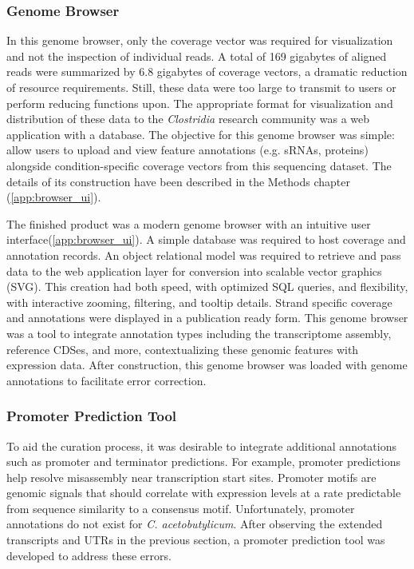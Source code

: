 \subsubsection{Genome Browser}
In this genome browser, only the coverage vector was required for visualization and not the inspection of individual reads. A total of 169 gigabytes of aligned reads were summarized by 6.8 gigabytes of coverage vectors, a dramatic reduction of resource requirements. Still, these data were too large to transmit to users or perform reducing functions upon. The appropriate format for visualization and distribution of these data to the \textit{Clostridia} research community was a web application with a database. The objective for this genome browser was simple: allow users to upload and view feature annotations (e.g. sRNAs, proteins) alongside condition-specific coverage vectors from this sequencing dataset. The details of its construction have been described in the Methods chapter (\ref{app:browser_ui}).

The finished product was a modern genome browser with an intuitive user interface(\ref{app:browser_ui}). A simple database was required to host coverage and annotation records. An object relational model was required to retrieve and pass data to the web application layer for conversion into scalable vector graphics (SVG). This creation had both speed, with optimized SQL queries, and flexibility, with interactive zooming, filtering, and tooltip details. Strand specific coverage and annotations were displayed in a publication ready form. This genome browser was a tool to integrate annotation types including the transcriptome assembly, reference CDSes, and more, contextualizing these genomic features with expression data. After construction, this genome browser was loaded with genome annotations to facilitate error correction.

\subsubsection{Promoter Prediction Tool}
To aid the curation process, it was desirable to integrate additional annotations such as promoter and terminator predictions. For example, promoter predictions help resolve misassembly near transcription start sites. Promoter motifs are genomic signals that should correlate with expression levels at a rate predictable from sequence similarity to a consensus motif. Unfortunately, promoter annotations do not exist for \textit{C. acetobutylicum}. After observing the extended transcripts and UTRs in the previous section, a promoter prediction tool was developed to address these errors.


